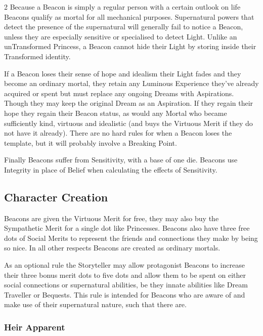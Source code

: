 \begin{multicols}{2}
Because a Beacon is simply a regular person with a certain outlook on life Beacons qualify as mortal for all mechanical purposes. Supernatural powers that detect the presence of the supernatural will generally fail to notice a Beacon, unless they are especially sensitive or specialised to detect Light. Unlike an unTransformed Princess, a Beacon cannot hide their Light by storing inside their Transformed identity.

If a Beacon loses their sense of hope and idealism their Light fades and they become an ordinary mortal, they retain any Luminous Experience they've already acquired or spent but must replace any ongoing Dreams with Aspirations. Though they may keep the original Dream as an Aspiration. If they regain their hope they regain their Beacon status, as would any Mortal who became sufficiently kind, virtuous and idealistic (and buys the Virtuous Merit if they do not have it already). There are no hard rules for when a Beacon loses the template, but it will probably involve a Breaking Point. 

Finally Beacons suffer from Sensitivity, with a base of one die. Beacons use Integrity in place of Belief when calculating the effects of Sensitivity. 

\subsection*{Character Creation}

Beacons are given the Virtuous Merit for free, they may also buy the Sympathetic Merit for a single dot like Princesses. Beacons also have three free dots of Social Merits to represent the friends and connections they make by being so nice. In all other respects Beacons are created as ordinary mortals.

As an optional rule the Storyteller may allow protagonist Beacons to increase their three bonus merit dots to five dots and allow them to be spent on either social connections or supernatural abilities, be they innate abilities like Dream Traveller or Bequests. This rule is intended for Beacons who are aware of and make use of their supernatural nature, such that there are.

\begin{mybox}

\subsubsection*{Heir Apparent}


\end{mybox}
\end{multicols}
